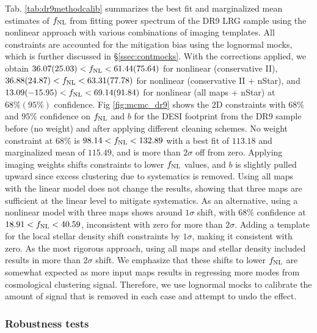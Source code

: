 Tab. \ref{tab:dr9methodcalib} summarizes the best fit and marginalized mean estimates of $f_{\rm NL}$ from fitting power spectrum of the DR9 LRG sample using the nonlinear approach with various combinations of imaging templates. All constraints are accounted for the mitigation bias using the lognormal mocks, which is further discussed in \S \ref{ssec:contmocks}. With the corrections applied, we obtain $36.07 (25.03) < f_{\rm NL} < 61.44(75.64)$ for nonlinear (conservative II), $36.88(24.87) < f_{\rm NL} < 63.31(77.78)$ for nonlinear (conservative II + nStar), and $13.09(-15.95) < f_{\rm NL} < 69.14(91.84)$ for nonlinear (all maps + nStar) at $68\% (95\%)$ confidence. Fig \ref{fig:mcmc_dr9} shows the 2D constraints with $68\%$ and $95\%$ confidence on $f_{\rm NL}$ and $b$ for the DESI footprint from the DR9 sample before (no weight) and after applying different cleaning schemes. No weight constraint at $68\%$ is $98.14<f_{\rm NL}<132.89$ with a best fit of $113.18$ and marginalized mean of $115.49$, and is more than $2\sigma$ off from zero. Applying imaging weights shifts constraints to lower $f_{\rm NL}$ values, and $b$ is slightly pulled upward since excess clustering due to systematics is removed. Using all maps with the linear model does not change the results, showing that three maps are sufficient at the linear level to mitigate systematics.  As an alternative, using a nonlinear model with three maps shows around $1\sigma$ shift, with $68\%$ confidence at $18.91<f_{\rm NL}<40.59$, inconsistent with zero for more than $2\sigma$. Adding a template for the local stellar density shift constraints by $1\sigma$, making it consistent with zero. As the most rigorous approach, using all maps and stellar density included results in more than $2\sigma$ shift. We emphasize that these shifts to lower $f_{\rm NL}$ are somewhat expected as more input maps results in regressing more modes from cosmological clustering signal. Therefore, we use lognormal mocks to calibrate the amount of signal that is removed in each case and attempt to undo the effect.



\subsubsection{Robustness tests}

